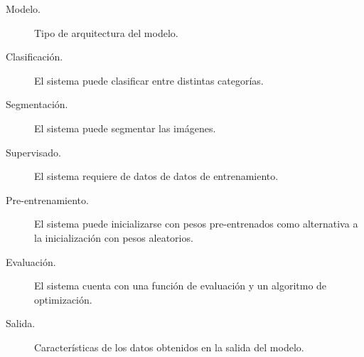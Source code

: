\begin{description}
    \item[Modelo.]{Tipo de arquitectura del modelo.}
    \item[Clasificación.]{El sistema puede clasificar entre distintas categorías.}
    \item[Segmentación.]{El sistema puede segmentar las imágenes.}
    \item[Supervisado.]{ El sistema requiere de datos de datos de entrenamiento.}
    \item[Pre-entrenamiento.]{El sistema puede inicializarse con pesos pre-entrenados como alternativa a la inicialización con pesos aleatorios.}
    \item[Evaluación.]{El sistema cuenta con una función de evaluación y un algoritmo de optimización.}
    \item[Salida.]{Características de los datos obtenidos en la salida del modelo.}
\end{description}
\newpage
